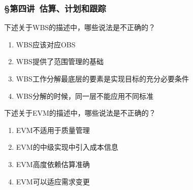 \subsubsection*{\S 第四讲\ 估算、计划和跟踪}
\setcounter{problemname}{0}

\begin{problem}
	下述关于WBS的描述中，哪些说法是不正确的？ 
        \begin{enumerate}[label=\Alph*.]
            \item WBS应该对应OBS
            \item WBS提供了范围管理的基础
            \item WBS工作分解最底层的要素是实现目标的充分必要条件
            \item WBS分解的时候，同一层不能应用不同标准
        \end{enumerate}
\end{problem}




\begin{problem}
	下述关于EVM的描述中，哪些说法是不正确的？
    \vspace{-0.8em}
    \begin{multicols}{2}
        \begin{enumerate}[label=\Alph*.]
            \item EVM不适用于质量管理
            \item EVM的中级实现中引入成本信息
            \item EVM高度依赖估算准确
            \item EVM可以适应需求变更
        \end{enumerate}
    \end{multicols}
    \vspace{-1em}
\end{problem}



